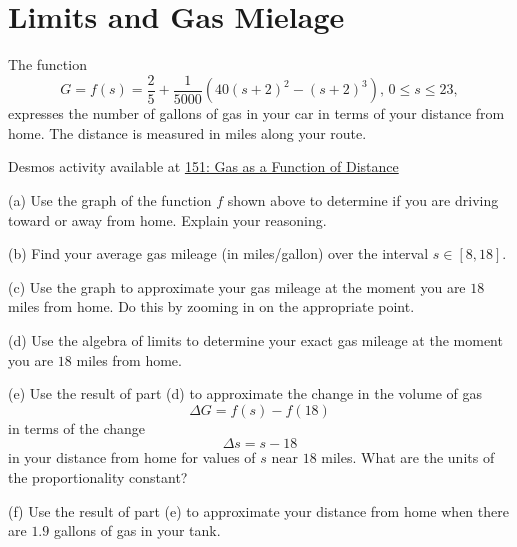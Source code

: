 \documentclass{ximera}
\begin{document}
\section{Limits and Gas Mielage}
\begin{example} \label{Ex:9sd8gfs}
The function 
\[
   G = f(s) = \frac{2}{5} +\frac{1}{5000}(40(s+2)^2 - (s+2)^3) , \, 0\leq s \leq 23 ,
\]
expresses the number of gallons of gas in your car in terms of your distance from home. The distance is measured in miles along your route. 

\begin{onlineOnly}
    \begin{center}
\end{center}
\end{onlineOnly}

Desmos activity available at
\href{https://www.desmos.com/calculator/xzkknfpkw3}{151: Gas as a Function of Distance}


(a) Use the graph of the function $f$ shown above to determine if you are driving toward or away from home. Explain your reasoning.

(b) Find your average gas mileage (in miles/gallon) over the interval $s \in [8,18]$.

(c) Use the graph to approximate your gas mileage at the moment you are $18$ miles from home. Do this by zooming in on the appropriate point.

(d) Use the algebra of limits to determine your exact gas mileage at the moment you are $18$ miles from home.




(e) Use the result of part (d) to approximate the change in the volume of gas
\[
    \Delta G = f(s)-f(18)
\]
in terms of the change
\[
   \Delta s = s - 18
\]
in your distance from home for values of $s$ near $18$ miles. What are the units of the proportionality constant?

(f) Use the result of part (e) to approximate your distance from home when there are $1.9$ gallons of gas in your tank.



\end{example}
\end{document}
